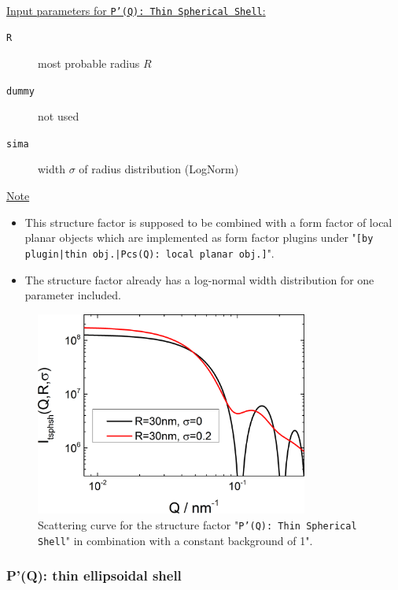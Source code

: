 \vspace{5mm}

\hspace{1pt}\\
\uline{Input parameters for \texttt{P'(Q): Thin Spherical Shell}:}
\begin{description}
    \item[\texttt{R}] most probable radius $R$
    \item[\texttt{dummy}] not used
    \item[\texttt{sima}] width $\sigma$ of radius distribution (LogNorm)
\end{description}

\noindent
\uline{Note}
\begin{itemize}
  \item This structure factor is supposed to be combined with a form factor of local planar objects which are implemented as form factor plugins
under "\texttt{[by plugin|thin obj.|Pcs(Q): local planar obj.]}".
\item The structure factor already has a log-normal width distribution for one parameter included.
\end{itemize}

\begin{figure}[htb]
\begin{center}
\includegraphics[width=0.8\textwidth,height=0.55\textwidth]{../images/form_factor/anisotropic/PprimeThinSphShell.png}
\end{center}
\caption{Scattering curve for the structure factor "\texttt{P'(Q): Thin Spherical Shell}" in combination with a constant background of 1".}
\label{fig_IQ:PprimeThinSphShell}
\end{figure}


\clearpage
\subsubsection{P'(Q): thin ellipsoidal shell} ~\\
\label{plugin:Pprime4ellShell}

